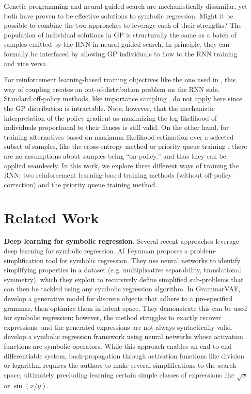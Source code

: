 \documentclass{article}
\begin{document}
Genetic programming and neural-guided search are mechanistically dissimilar, yet both have proven to be effective solutions to symbolic regression.
Might it be possible to combine the two approaches to leverage each of their strengths?
The population of individual solutions in GP is structurally the same as a batch of samples emitted by the RNN in neural-guided search.
In principle, they can formally be interfaced by allowing GP individuals to flow to the RNN training and vice versa.

For reinforcement learning-based training objectives like the one used in \citet{petersen2019deep},
this way of coupling creates an out-of-distribution problem on the RNN side.
Standard off-policy methods, like importance sampling \citep{glynn1989importance}, do not apply here since the GP distribution is intractable.
Note, however, that the mechanistic interpretation of the policy gradient as maximizing the log likelihood of individuals proportional to their fitness is still valid.
On the other hand, for training alternatives based on maximum likelihood estimation over a selected subset of samples,
like the cross-entropy method \citep{de2005tutorial} or priority queue training \citep{abolafia2018neural},
there are no assumptions about samples being ``on-policy,'' and thus they can be applied seamlessly. 
In this work, we explore three different ways of training the RNN: two reinforcement learning-based training methods (without off-policy correction) and the priority queue training method.

\section{Related Work}

\textbf{Deep learning for symbolic regression.}
Several recent approaches leverage deep learning for symbolic regression.
AI Feynman \citep{udrescu2020ai} proposes a problem-simplification tool for symbolic regression.
They use neural networks to identify simplifying properties in a dataset (e.g. multiplicative separability, translational symmetry), which they exploit to recursively define simplified sub-problems that can then be tackled using any symbolic regression algorithm.
In GrammarVAE, \citet{kusner2017grammar} develop a generative model for discrete objects that adhere to a pre-specified grammar, then optimize them in latent space.
They demonstrate this can be used for symbolic regression; however, the method struggles to exactly recover expressions, and the generated expressions are not always syntactically valid.
\citet{sahoo2018learning} develop a symbolic regression framework using neural networks whose activation functions are symbolic operators.
While this approach enables an end-to-end differentiable system, back-propagation through activation functions like division or logarithm requires the authors to make several simplifications to the search space, ultimately precluding learning certain simple classes of expressions like $\sqrt{x}$ or $\sin(x/y)$. 
\end{document}
